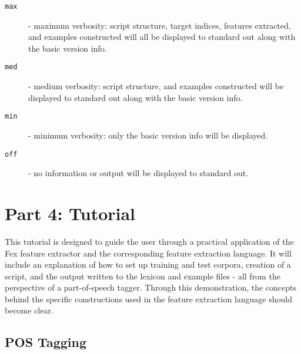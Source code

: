 \documentclass[11pt]{article}
\begin{document}
\begin{description}
\begin{description}
\item[{\tt max}] - maximum verbosity:  script structure, target indices,
features extracted, and examples constructed will all be displayed to standard
out along with the basic version info.
\item[{\tt med}] - medium verbosity:  script structure, and examples constructed
will be displayed to standard out along with the basic version info.
\item[{\tt min}] - minimum verbosity:  only the basic version info will be 
displayed.
\item[{\tt off}] - no information or output will be displayed to standard out.
\end{description}
\end{description}

\section*{Part 4:  Tutorial}

This tutorial is designed to guide the user through a practical application of 
the Fex feature extractor and the corresponding feature extraction language.
It will include an explanation of how to set up training and test corpora,
creation of a script, and the output written to the lexicon and example files -
all from the perspective of a part-of-speech tagger.  Through this 
demonstration, the concepts behind the specific constructions used in the 
feature extraction language should become clear.

\subsection*{POS Tagging}
\end{document}
